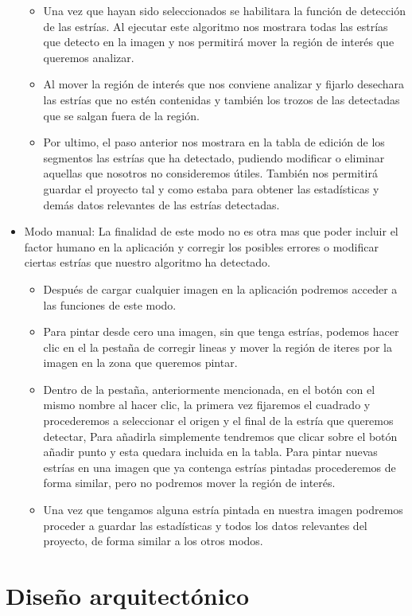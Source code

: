 \begin{itemize}
\begin{itemize}
		\item Una vez que hayan sido seleccionados se habilitara la función de detección de las estrías. Al ejecutar este algoritmo nos mostrara todas las estrías que detecto en la imagen y nos permitirá mover la región de interés que queremos analizar.
		\item Al mover la región de interés que nos conviene analizar y fijarlo desechara las estrías que no estén contenidas y también los trozos de las detectadas que se salgan fuera de la región.
		\item Por ultimo, el paso anterior nos mostrara en la tabla de edición de los segmentos las estrías que ha detectado, pudiendo modificar o eliminar aquellas que nosotros no consideremos útiles.
		También nos permitirá guardar el proyecto tal y como estaba para obtener las estadísticas y demás datos relevantes de las estrías detectadas.
	\end{itemize}
	\item Modo manual:
	La finalidad de este modo no es otra mas que poder incluir el factor humano en la aplicación y corregir los posibles errores o modificar ciertas estrías que nuestro algoritmo ha detectado.
	\begin{itemize}
		\item Después de cargar cualquier imagen en la aplicación podremos acceder a las funciones de este modo.
		\item Para pintar desde cero una imagen, sin que tenga estrías, podemos hacer clic en el la pestaña de corregir lineas y mover la región de iteres por la imagen en la zona que queremos pintar. 
		\item Dentro de la pestaña, anteriormente mencionada, en el botón con el mismo nombre al hacer clic, la primera vez fijaremos el cuadrado y procederemos a seleccionar el origen y el final de la estría que queremos detectar, Para añadirla simplemente tendremos que clicar sobre el botón añadir punto y esta quedara incluida en la tabla. Para pintar nuevas estrías en una imagen que ya contenga estrías pintadas procederemos de forma similar, pero no podremos mover la región de interés. 
		\item Una vez que tengamos alguna estría pintada en nuestra imagen podremos proceder a guardar las estadísticas y todos los datos relevantes del proyecto, de forma similar a los otros modos.
	\end{itemize}

\end{itemize}

\section{Diseño arquitectónico}

